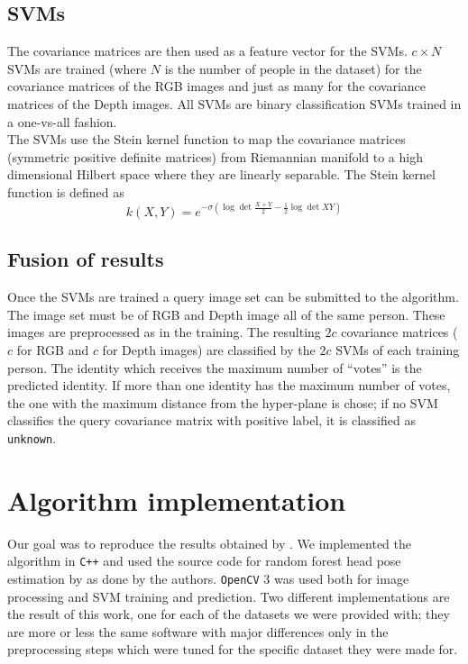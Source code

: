 \documentclass{article}
\begin{document}
\subsection{SVMs}\label{sec:svm}
The covariance matrices are then used as a feature vector for the SVMs. $c \times N$ SVMs are trained (where $N$ is the number of people in the dataset) for the covariance matrices of the RGB images and just as many for the covariance matrices of the Depth images. All SVMs are binary classification SVMs trained in a one-vs-all fashion. \\
The SVMs use the Stein kernel function to map the covariance matrices (symmetric positive definite matrices) from Riemannian manifold to a high dimensional Hilbert space where they are linearly separable. The Stein kernel function is defined as
$$k(X,Y) = e^{-\sigma (\log{\det{\frac{X+Y}{2}}} - \frac{1}{2}\log{\det{XY}})}$$

\subsection{Fusion of results}
Once the SVMs are trained a query image set can be submitted to the algorithm. The image set must be of RGB and Depth image all of the same person. These images are preprocessed as in the training. The resulting $2c$ covariance matrices ($c$ for RGB and $c$ for Depth images) are classified by the $2c$ SVMs of each training person. The identity which receives the maximum number of ``votes'' is the predicted identity.
If more than one identity has the maximum number of votes, the one with the maximum distance from the hyper-plane is chose; if no SVM classifies the query covariance matrix with positive label, it is classified as \verb|unknown|.

\section{Algorithm implementation}\label{sec:algorithm_impl}
Our goal was to reproduce the results obtained by \citet{Hayat2016}. We implemented the algorithm in \verb|C++| and used the source code for random forest head pose estimation by \citet{Fanelli2013} as done by the authors. \verb|OpenCV| 3 was used both for image processing and SVM training and prediction. Two different implementations are the result of this work, one for each of the datasets we were provided with; they are more or less the same software with major differences only in the preprocessing steps which were tuned for the specific dataset they were made for.
\end{document}
